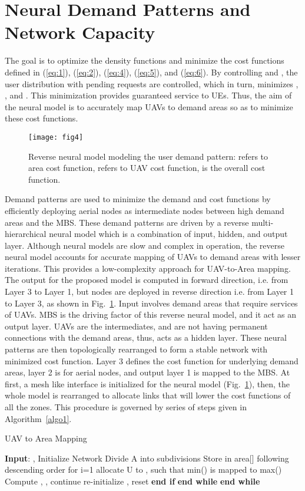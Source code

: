 \documentclass[journal]{IEEEtran}
\begin{document}
\section{Neural Demand Patterns and Network Capacity}
The goal is to optimize the density functions and minimize the cost functions defined in (\ref{eq:1}), (\ref{eq:2}), (\ref{eq:4}), (\ref{eq:5}), and (\ref{eq:6}). By controlling  and , the user distribution with pending requests are controlled, which in turn, minimizes , , and . This minimization provides guaranteed service to UEs. Thus, the aim of the neural model is to accurately map UAVs to demand areas so as to minimize these cost functions.
\begin{figure}[!ht]
  \centering
\texttt{[image: fig4]}\\
  \caption{Reverse neural model modeling the user demand pattern:  refers to area cost function,  refers to UAV cost function,  is the overall cost function.}\label{fig4}
\end{figure}
Demand patterns are used to minimize the demand and cost functions by efficiently deploying aerial nodes as intermediate nodes between high demand areas and the MBS. These demand patterns are driven by a reverse multi-hierarchical neural model which is a combination of input, hidden, and output layer. Although neural models are slow and complex in operation, the reverse neural model accounts for accurate mapping of UAVs to demand areas with lesser iterations. This provides a low-complexity approach for UAV-to-Area mapping. The output for the proposed model is computed in forward direction, i.e. from Layer 3 to Layer 1, but nodes are deployed in reverse direction i.e. from Layer 1 to Layer 3, as shown in Fig.~\ref{fig4}. Input involves demand areas that require services of UAVs. MBS is the driving factor of this reverse neural model, and it act as an output layer. UAVs are the intermediates, and are not having permanent connections with the demand areas, thus, acts as a hidden layer. These neural patterns are then topologically rearranged to form a stable network with minimized cost function. Layer 3 defines the cost function for underlying demand areas, layer 2 is for aerial nodes, and output layer 1 is mapped to the MBS. At first, a mesh like interface is initialized for the neural model (Fig.~\ref{fig4}), then, the whole model is rearranged to allocate links that will lower the cost functions of all the zones. This procedure is governed by series of steps given in Algorithm~\ref{algo1}.
\begin{algorithm}[!ht]
\fontsize{7}{9}\selectfont
\caption{UAV to Area Mapping}
\label{algo1}
\begin{algorithmic}[1]
\State \textbf{Input}: , 
\State Initialize Network
\State Divide A into subdivisions 
\State Store  in area[] following descending order for 
\State i=1
\While{()}
\State allocate U to , such that min() is mapped to max()
\State Compute , , 
\State continue
\Else
\State re-initialize , 
\State reset
\EndIf
\State \textbf{end if}
\State 
\EndWhile
\State \textbf{end while}
\EndWhile
\State \textbf{end while}
\end{algorithmic}
\end{algorithm}
\end{document}
